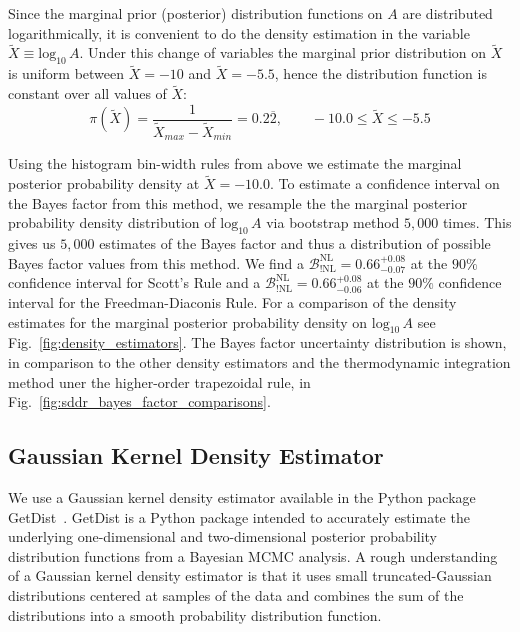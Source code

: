 Since the marginal prior (posterior) distribution functions on $A$ are distributed logarithmically, it is convenient to do the density estimation in the variable $\tilde{X} \equiv \mathrm{log}_{10} \, A$. Under this change of variables the marginal prior distribution on $\tilde{X}$ is uniform between $\tilde{X}=-10$ and $\tilde{X}=-5.5$, hence the distribution function is constant over all values of $\tilde{X}$:
\begin{equation}
    \pi\left(\tilde{X}\right) = \frac{1}{\tilde{X}_{max} - \tilde{X}_{min}} = 0.2\overbar{2}, \qquad -10.0 \leq \tilde{X} \leq -5.5
\end{equation}

Using the histogram bin-width rules from above we estimate the marginal posterior probability density at $\tilde{X} = -10.0$. To estimate a confidence interval on the Bayes factor from this method, we resample the the marginal posterior probability density distribution of $\mathrm{log}_{10} \, A$ via bootstrap method \cite{efron1992bootstrap} $5,000$ times. This gives us $5,000$ estimates of the Bayes factor and thus a distribution of possible Bayes factor values from this method. We find a $\mathcal{B}^{\mathrm{NL}}_{!\mathrm{NL}} = 0.66^{+0.08}_{-0.07}$ at the $90\%$ confidence interval for Scott's Rule and a $\mathcal{B}^{\mathrm{NL}}_{!\mathrm{NL}} = 0.66^{+0.08}_{-0.06}$ at the $90\%$ confidence interval for the Freedman-Diaconis Rule. For a comparison of the density estimates for the marginal posterior probability density on $\mathrm{log}_{10} \, A$ see Fig.~\ref{fig:density_estimators}. The Bayes factor uncertainty distribution is shown, in comparison to the other density estimators and the thermodynamic integration method uner the higher-order trapezoidal rule, in Fig.~\ref{fig:sddr_bayes_factor_comparisons}.

\subsection{Gaussian Kernel Density Estimator}
We use a Gaussian kernel density estimator available in the Python package GetDist~\citep{lewis2015getdist}. GetDist is a Python package intended to accurately estimate the underlying one-dimensional and two-dimensional posterior probability distribution functions from a Bayesian MCMC analysis. A rough understanding of a Gaussian kernel density estimator is that it uses small truncated-Gaussian distributions centered at samples of the data and combines the sum of the distributions into a smooth probability distribution function.

